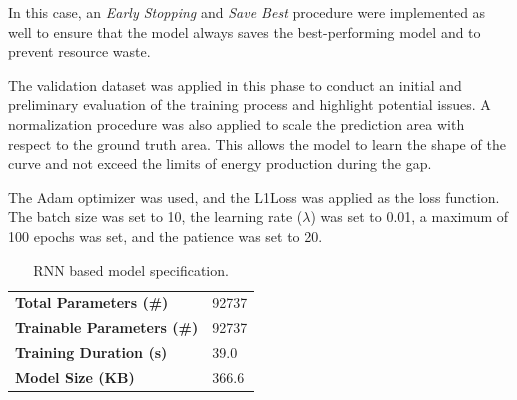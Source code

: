 In this case, an \textit{Early Stopping} and \textit{Save Best} procedure were implemented
as well to ensure that the model always saves the best-performing model and to prevent
resource waste.

The validation dataset was applied in this phase to conduct an initial
and preliminary evaluation of the training process and highlight potential issues.
A normalization procedure was also applied to scale the prediction area with respect
to the ground truth area.
This allows the model to learn the shape of the curve and not exceed the limits
of energy production during the gap.

The Adam optimizer was used, and the L1Loss was applied as the loss function.
The batch size was set to 10, the learning rate ($\lambda$) was set to 0.01,
a maximum of 100 epochs was set, and the patience was set to 20.


\begin{table}[H]
	\begin{center}
		\begin{tabular}[c]{l|l}
			\textbf{Total Parameters (\#)}     & 92737 \\
			\textbf{Trainable Parameters (\#)} & 92737 \\
			\textbf{Training Duration (s)}     & 39.0  \\
			\textbf{Model Size (KB)}           & 366.6
		\end{tabular}
	\end{center}
	\caption{RNN based model specification.}\label{tab:ufcnspecs}
\end{table}

